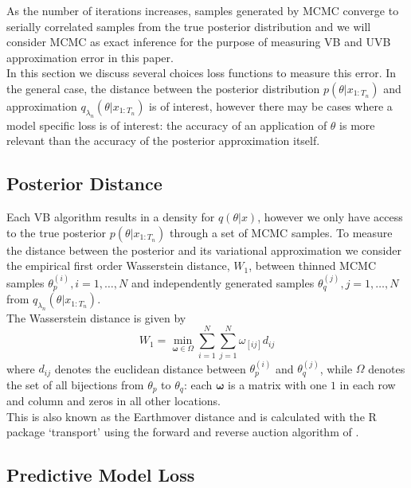 \documentclass[12pt,a4paper]{article}\usepackage[]{graphicx}\usepackage[]{color}
\begin{document}
As the number of iterations increases, samples generated by MCMC converge to serially correlated samples from the true posterior distribution and we will consider MCMC as exact inference for the purpose of measuring VB and UVB approximation error in this paper.
\\

In this section we discuss several choices loss functions to measure this error. In the general case, the distance between the posterior distribution $p(\theta | x_{1:T_n})$ and approximation $q_{\lambda_n}(\theta |  x_{1:T_n})$ is of interest, however there may be cases where a model specific loss is of interest: the accuracy of an application of $\theta$ is more relevant than the accuracy of the posterior approximation itself. 


\subsection{Posterior Distance}

Each VB algorithm results in a density for $q(\theta | x)$, however we only have access to the true posterior $p(\theta | x_{1:T_n})$ through a set of MCMC samples. To measure the distance between the posterior and its variational approximation we consider the empirical first order Wasserstein distance, $W_1$, between thinned MCMC samples $\theta^{(i)}_p, i = 1, \dots, N$ and independently generated samples $\theta^{(j)}_q, j = 1, \dots, N$ from $q_{\lambda_n}(\theta |  x_{1:T_n})$.
\\

The Wasserstein distance is given by
\begin{equation}
\label{wasserstein}
W_1 = \underset{\boldsymbol{\omega} \in \Omega}{\min} \sum_{i=1}^N \sum_{j=1}^N \omega_{[ij]} d_{ij}
\end{equation}
where $d_{ij}$ denotes the euclidean distance between $\theta^{(i)}_p$ and $\theta^{(j)}_q$, while $\Omega$ denotes the set of all bijections from $\theta_p$ to $\theta_q$: each $\boldsymbol{\omega}$ is a matrix with one $1$ in each row and column and zeros in all other locations.
\\

This is also known as the Earthmover distance and is calculated with the R package `transport' \citep{transport} using the forward and reverse auction algorithm of \citet{Bertsekas1992}.

\subsection{Predictive Model Loss}
\end{document}
